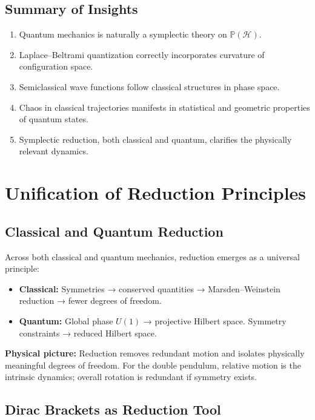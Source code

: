 \documentclass[11pt]{book}
\begin{document}
\section{Summary of Insights}
\begin{enumerate}
   \item
 Quantum mechanics is naturally a symplectic theory on $\mathbb{P}(\mathcal{H})$.  
   \item
 Laplace–Beltrami quantization correctly incorporates curvature of configuration space.  
   \item
 Semiclassical wave functions follow classical structures in phase space.  
   \item
 Chaos in classical trajectories manifests in statistical and geometric properties of quantum states.  
   \item
 Symplectic reduction, both classical and quantum, clarifies the physically relevant dynamics.
\end{enumerate}

\chapter{Unification of Reduction Principles}

\section{Classical and Quantum Reduction}

Across both classical and quantum mechanics, reduction emerges as a universal principle:

\begin{itemize}
    \item \textbf{Classical:} Symmetries → conserved quantities → Marsden–Weinstein reduction → fewer degrees of freedom.  
    \item \textbf{Quantum:} Global phase $U(1)$ → projective Hilbert space. Symmetry constraints → reduced Hilbert space.  
\end{itemize}

\textbf{Physical picture:} Reduction removes redundant motion and isolates physically meaningful degrees of freedom. For the double pendulum, relative motion is the intrinsic dynamics; overall rotation is redundant if symmetry exists.

\section{Dirac Brackets as Reduction Tool}
\end{document}
